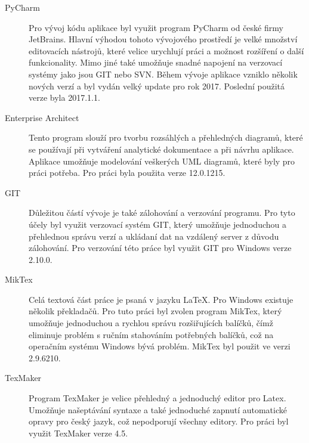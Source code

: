 \documentclass[thesis=B,czech]{resources/FITthesis}[2012/06/26]
\begin{document}
\begin{description}
\item[PyCharm] Pro vývoj kódu aplikace byl využit program PyCharm od české firmy JetBrains. Hlavní výhodou tohoto vývojového prostředí je velké množství editovacích nástrojů, které velice urychlují práci a možnost rozšíření o další funkcionality. Mimo jiné také umožňuje snadné napojení na verzovací systémy jako jsou GIT nebo SVN. Během vývoje aplikace vzniklo několik nových verzí a byl vydán velký update pro rok 2017. Poslední použitá verze byla 2017.1.1.

\item[Enterprise Architect] Tento program slouží pro tvorbu rozsáhlých a přehledných diagramů, které se používají při vytváření analytické dokumentace a při návrhu aplikace. Aplikace umožňuje modelování veškerých UML diagramů, které byly pro práci potřeba. Pro práci byla použita verze 12.0.1215.

\item[GIT] Důležitou částí vývoje je také zálohování a verzování programu. Pro tyto účely byl využit verzovací systém GIT, který umožňuje jednoduchou a přehlednou správu verzí a ukládaní dat na vzdálený server z důvodu zálohování. Pro verzování této práce byl využit GIT pro Windows verze 2.10.0.

\item[MikTex] Celá textová část práce je psaná v jazyku \LaTeX. Pro Windows existuje několik překladačů. Pro tuto práci byl zvolen program MikTex, který umožňuje jednoduchou a rychlou správu rozšiřujících balíčků, čímž eliminuje problém s ručním stahováním potřebných balíčků, což na operačním systému Windows bývá problém. MikTex byl použit ve verzi 2.9.6210.

\item[TexMaker] Program TexMaker je velice přehledný a jednoduchý editor pro Latex. Umožňuje našeptávání syntaxe a také jednoduché zapnutí automatické opravy pro český jazyk, což nepodporují všechny editory. Pro práci byl využit TexMaker verze 4.5.
\end{description}
\end{document}
